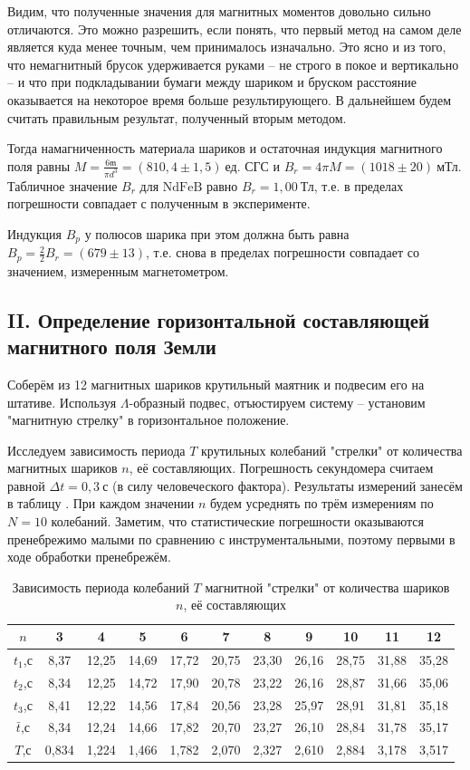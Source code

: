 \documentclass[a4paper,10pt]{article}
\begin{document}
Видим, что полученные значения для магнитных моментов довольно сильно отличаются. Это можно разрешить, если понять, что первый метод на самом деле является куда менее точным, чем принималось изначально. Это ясно и из того, что немагнитный брусок удерживается руками -- не строго в покое и вертикально -- и что при подкладывании бумаги между шариком и бруском расстояние оказывается на некоторое время больше результирующего. В дальнейшем будем считать правильным результат, полученный вторым методом.

Тогда намагниченность материала шариков и остаточная индукция магнитного поля равны $M=\frac{6\mathfrak{m}}{\pi d^3}=\left(810,4\pm1,5\right)~\text{ед. СГС}$ и $B_r=4\pi M=\left(1018\pm20\right)~\text{мТл}$. Табличное значение $B_r$ для $\text{NdFeB}$ равно $B_r=1,00~\text{Тл}$, т.е. в пределах погрешности совпадает с полученным в эксперименте.

Индукция $B_p$ у полюсов шарика при этом должна быть равна $B_p=\frac{2}{2}B_r=\left(679\pm13\right)$, т.е. снова в пределах погрешности совпадает со значением, измеренным магнетометром.

\subsection*{II. Определение горизонтальной составляющей магнитного поля Земли}

Соберём из 12 магнитных шариков крутильный маятник и подвесим его на штативе. Используя $\Lambda$-образный подвес, отъюстируем систему -- установим "магнитную стрелку" в горизонтальное положение.

Исследуем зависимость периода $T$ крутильных колебаний "стрелки" от количества магнитных шариков $n$, её составляющих. Погрешность секундомера считаем равной $\Delta t=0,3~\text{с}$ (в силу человеческого фактора). Результаты измерений занесём в таблицу . При каждом значении $n$ будем усреднять по трём измерениям по $N=10$ колебаний. Заметим, что статистические погрешности оказываются пренебрежимо малыми по сравнению с инструментальными, поэтому первыми в ходе обработки пренебрежём.

\begin{table}[h]
	\centering
	\caption{Зависимость периода колебаний $T$ магнитной "стрелки" от количества шариков $n$, её составляющих} \label{koleb}
	\begin{tabular}{|c|c|c|c|c|c|c|c|c|c|c|}
		\hline
		$n$&3&4&5&6&7&8&9&10&11&12\\ \hline
		$t_1$,с&8,37&12,25&14,69&17,72&20,75&23,30&26,16&28,75&31,88&35,28\\ \hline
		$t_2$,с&8,34&12,25&14,72&17,90&20,78&23,22&26,16&28,87&31,66&35,06\\ \hline
		$t_3$,с&8,41&12,22&14,56&17,84&20,56&23,28&25,97&28,91&31,81&35,18\\ \hline
		$\bar{t}$,с&8,34&12,24&14,66&17,82&20,70&23,27&26,10&28,84&31,78&35,17\\ \hline
		$T$,с&0,834&1,224&1,466&1,782&2,070&2,327&2,610&2,884&3,178&3,517\\ \hline
	\end{tabular}
\end{table}
\end{document}
